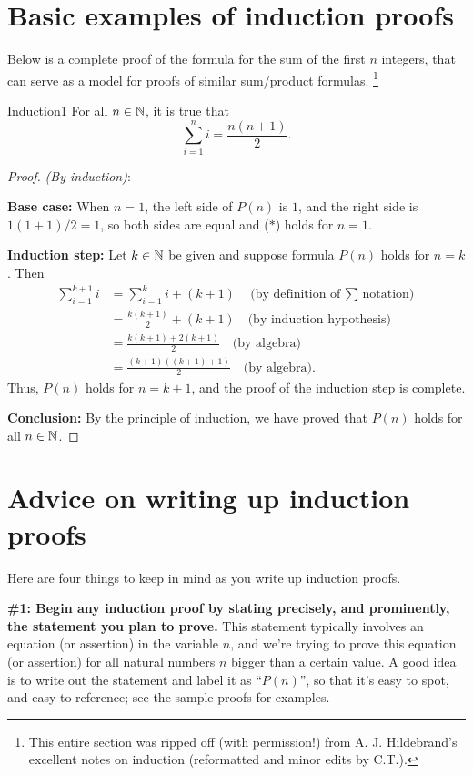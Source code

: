 

\section{ Basic examples of induction proofs}\label{sec:basic_induction}

Below is a complete proof of the
formula for the sum of the first $n$ integers, that can serve as a model
for proofs of similar sum/product formulas. \footnote{This entire section was ripped off (with permission!) from A. J. Hildebrand's excellent notes on induction (reformatted and minor edits  by C.T.).}

\begin{prop}{Induction1} For all $n\in\mathbb{N}$,  it is true that
\[
\sum_{i=1}^n i=\frac{n(n+1)}{2}.
\tag{$P(n)$}
\]
\end{prop}
\begin{proof} \emph{(By induction)}:

\noindent
\textbf{Base case:} When $n=1$, the left side of $P(n)$ is $1$, and the
right side is $1(1+1)/2=1$, so both sides are equal and ($*$) holds  
for $n=1$.

\noindent
\textbf{Induction step:} Let $k\in\mathbb{N}$ be given and suppose 
formula $P(n)$ holds for $n=k$. Then
\begin{align*}
\sum_{i=1}^{k+1}i&=\sum_{i=1}^k i + (k+1)\quad\text{(by 
definition of $\sum$ notation)}
\\
&=\frac{k(k+1)}{2}+(k+1)\quad \text{(by induction hypothesis)}
\\
&=\frac{k(k+1)+2(k+1)}{2}\quad \text{(by algebra)}
\\
&=\frac{(k+1)((k+1)+1)}{2}\quad \text{(by algebra)}.
\end{align*}
Thus, $P(n)$ holds for $n=k+1$, and the proof of the induction step is complete. 

\noindent
\textbf{Conclusion:} By the principle of induction, 
we have proved that $P(n)$ holds for all $n\in\mathbb{N}$.  
\end{proof}


\section{Advice on writing up induction proofs}
Here are four things to keep in mind as you write up induction proofs.

\noindent
 \textbf{\#1: Begin any induction proof by stating precisely, 
and prominently, the
statement  you plan to prove.} 
This statement typically involves an equation (or assertion) in the variable $n$, and we're trying to prove this equation (or assertion) for all natural numbers $n$ bigger than a certain value.  A good idea is to write out the statement and label it as ``$P(n)$'', so that it's easy to spot, and easy to reference; see the sample proofs for
examples.

